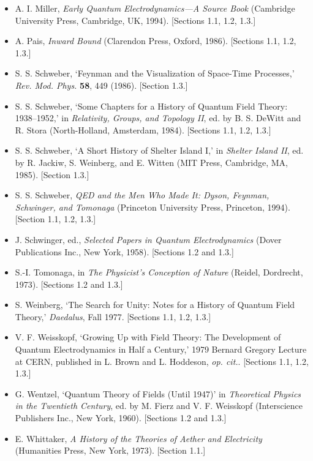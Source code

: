 \begin{itemize}
\item A. I. Miller, \emph{Early Quantum Electrodynamics---A Source Book}
(Cambridge University Press, Cambridge, UK, 1994). [Sections 1.1, 1.2, 1.3.]

\item A. Pais, \emph{Inward Bound} (Clarendon Press, Oxford, 1986).
[Sections 1.1, 1.2, 1.3.]

\item S. S. Schweber, `Feynman and the Visualization of Space-Time
Processes,' \emph{Rev. Mod. Phys.} \textbf{58}, 449 (1986). [Section 1.3.]

\item S. S. Schweber, `Some Chapters for a History of Quantum Field Theory:
1938--1952,' in \emph{Relativity, Groups, and Topology II}, ed. by B. S.
DeWitt and R. Stora (North-Holland, Amsterdam, 1984). [Sections 1.1, 1.2,
1.3.]

\item S. S. Schweber, `A Short History of Shelter Island I,' in \emph{Shelter
Island II}, ed. by R. Jackiw, S. Weinberg, and E. Witten (MIT Press,
Cambridge, MA, 1985). [Section 1.3.]

\item S. S. Schweber, \emph{QED and the Men Who Made It: Dyson, Feynman,
Schwinger, and Tomonaga} (Princeton University Press, Princeton, 1994).
[Section 1.1, 1.2, 1.3.]

\item J. Schwinger, ed., \emph{Selected Papers in Quantum Electrodynamics}
(Dover Publications Inc., New York, 1958). [Sections 1.2 and 1.3.]

\item S.-I. Tomonaga, in \emph{The Physicist's Conception of Nature}
(Reidel, Dordrecht, 1973). [Sections 1.2 and 1.3.]

\item S. Weinberg, `The Search for Unity: Notes for a History of Quantum
Field Theory,' \emph{Daedalus}, Fall 1977. [Sections 1.1, 1.2, 1.3.]

\item V. F. Weisskopf, `Growing Up with Field Theory: The Development of
Quantum Electrodynamics in Half a Century,' 1979 Bernard Gregory Lecture at
CERN, published in L. Brown and L. Hoddeson, \emph{op. cit.}. [Sections 1.1,
1.2, 1.3.]

\item G. Wentzel, `Quantum Theory of Fields (Until 1947)' in \emph{Theoretical
Physics in the Twentieth Century}, ed. by M. Fierz and V. F. Weisskopf
(Interscience Publishers Inc., New York, 1960). [Sections 1.2 and 1.3.]

\item E. Whittaker, \emph{A History of the Theories of Aether and Electricity}
(Humanities Press, New York, 1973). [Section 1.1.]
\end{itemize}

